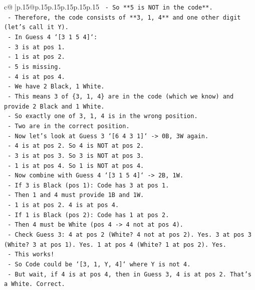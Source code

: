 \documentclass{article}
\begin{document}
{\begin{supertabular}{c@{$\;$}|p{.15\linewidth}@{}p{.15\linewidth}p{.15\linewidth}p{.15\linewidth}p{.15\linewidth}p{.15\linewidth}}
{{{\texttt{      {-} So **5 is NOT in the code**.} \\
\texttt{      {-} Therefore, the code consists of **3, 1, 4** and one other digit (let's call it Y).} \\
\texttt{      {-} In Guess 4 `{[}3 1 5 4{]}`:} \\
\texttt{        {-} 3 is at pos 1.} \\
\texttt{        {-} 1 is at pos 2.} \\
\texttt{        {-} 5 is missing.} \\
\texttt{        {-} 4 is at pos 4.} \\
\texttt{        {-} We have 2 Black, 1 White.} \\
\texttt{        {-} This means 3 of \{3, 1, 4\} are in the code (which we know) and provide 2 Black and 1 White.} \\
\texttt{        {-} So exactly one of 3, 1, 4 is in the wrong position.} \\
\texttt{        {-} Two are in the correct position.} \\
\texttt{    {-} Now let's look at Guess 3 `{[}6 4 3 1{]}` {-}> 0B, 3W again.} \\
\texttt{      {-} 4 is at pos 2. So 4 is NOT at pos 2.} \\
\texttt{      {-} 3 is at pos 3. So 3 is NOT at pos 3.} \\
\texttt{      {-} 1 is at pos 4. So 1 is NOT at pos 4.} \\
\texttt{    {-} Now combine with Guess 4 `{[}3 1 5 4{]}` {-}> 2B, 1W.} \\
\texttt{      {-} If 3 is Black (pos 1): Code has 3 at pos 1.} \\
\texttt{        {-} Then 1 and 4 must provide 1B and 1W.} \\
\texttt{        {-} 1 is at pos 2. 4 is at pos 4.} \\
\texttt{        {-} If 1 is Black (pos 2): Code has 1 at pos 2.} \\
\texttt{          {-} Then 4 must be White (pos 4 {-}> 4 not at pos 4).} \\
\texttt{          {-} Check Guess 3: 4 at pos 2 (White? 4 not at pos 2). Yes. 3 at pos 3 (White? 3 at pos 1). Yes. 1 at pos 4 (White? 1 at pos 2). Yes.} \\
\texttt{          {-} This works!} \\
\texttt{          {-} So Code could be `{[}3, 1, Y, 4{]}` where Y is not 4.} \\
\texttt{          {-} But wait, if 4 is at pos 4, then in Guess 3, 4 is at pos 2. That's a White. Correct.} \\
}}}
\end{supertabular}}
\end{document}
